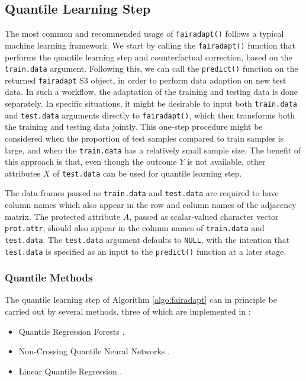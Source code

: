 \documentclass[
  nojss]{jss}
\providecommand{\tightlist}{%
  \setlength{\itemsep}{0pt}\setlength{\parskip}{0pt}}
\begin{document}
\hypertarget{quantile-learning-step}{%
\subsection{Quantile Learning Step}\label{quantile-learning-step}}

The most common and recommended usage of \texttt{fairadapt()} follows a
typical machine learning framework. We start by calling the
\texttt{fairadapt()} function that performs the quantile learning step
and counterfactual correction, based on the \texttt{train.data}
argument. Following this, we can call the \texttt{predict()} function on
the returned \texttt{fairadapt} S3 object, in order to perform data
adaption on new test data. In such a workflow, the adaptation of the
training and testing data is done separately. In specific situations, it
might be desirable to input both \texttt{train.data} and
\texttt{test.data} arguments directly to \texttt{fairadapt()}, which
then transforms both the training and testing data jointly. This
one-step procedure might be considered when the proportion of test
samples compared to train samples is large, and when the
\texttt{train.data} has a relatively small sample size. The benefit of
this approach is that, even though the outcome \(Y\) is not available,
other attributes \(X\) of \texttt{test.data} can be used for quantile
learning step.

The data frames passed as \texttt{train.data} and \texttt{test.data} are
required to have column names which also appear in the row and column
names of the adjacency matrix. The protected attribute \(A\), passed as
scalar-valued character vector \texttt{prot.attr}, should also appear in
the column names of \texttt{train.data} and \texttt{test.data}. The
\texttt{test.data} argument defaults to \texttt{NULL}, with the
intention that \texttt{test.data} is specified as an input to the
\texttt{predict()} function at a later stage.

\hypertarget{quantile-methods}{%
\subsubsection{Quantile Methods}\label{quantile-methods}}

The quantile learning step of Algorithm \ref{algo:fairadapt} can in
principle be carried out by several methods, three of which are
implemented in :

\begin{itemize}
\tightlist
\item
  Quantile Regression Forests
  \citep{meinshausen2006qrf, wright2015ranger}.
\item
  Non-Crossing Quantile Neural Networks
  \citep{cannon2018non, cannon2015package}.
\item
  Linear Quantile Regression \citep{koenker2001qr, koenker2018package}.
\end{itemize}
\end{document}
